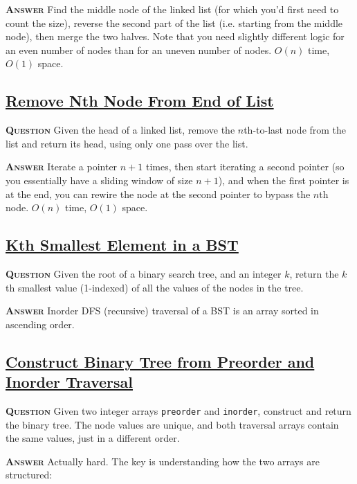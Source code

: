 \documentclass[table, xcdraw]{article}%
\begin{document}
\textsc{\textbf{Answer}} Find the middle node of the linked list (for which you'd first need to count the size), reverse the second part of the list (i.e. starting from the middle node), then merge the two halves. Note that you need slightly different logic for an even number of nodes than for an uneven number of nodes. $O(n)$ time, $O(1)$ space.

\subsection{\href{https://leetcode.com/problems/remove-nth-node-from-end-of-list}{Remove Nth Node From End of List}}

\textsc{\textbf{Question}} Given the head of a linked list, remove the $n$th-to-last node from the list and return its head, using only one pass over the list.

\textsc{\textbf{Answer}} Iterate a pointer $n+1$ times, then start iterating a second pointer (so you essentially have a sliding window of size $n+1$), and when the first pointer is at the end, you can rewire the node at the second pointer to bypass the $n$th node. $O(n)$ time, $O(1)$ space.

\subsection{\href{https://leetcode.com/problems/kth-smallest-element-in-a-bst}{Kth Smallest Element in a BST}}

\textsc{\textbf{Question}} Given the root of a binary search tree, and an integer $k$, return the $k$th smallest value (1-indexed) of all the values of the nodes in the tree.

\textsc{\textbf{Answer}} Inorder DFS (recursive) traversal of a BST is an array sorted in ascending order.

\subsection{\href{https://leetcode.com/problems/construct-binary-tree-from-preorder-and-inorder-traversal}{Construct Binary Tree from Preorder and Inorder Traversal}}

\textsc{\textbf{Question}} Given two integer arrays \texttt{preorder} and \texttt{inorder}, construct and return the binary tree. The node values are unique, and both traversal arrays contain the same values, just in a different order.

\textsc{\textbf{Answer}} Actually hard. The key is understanding how the two arrays are structured:
\end{document}
